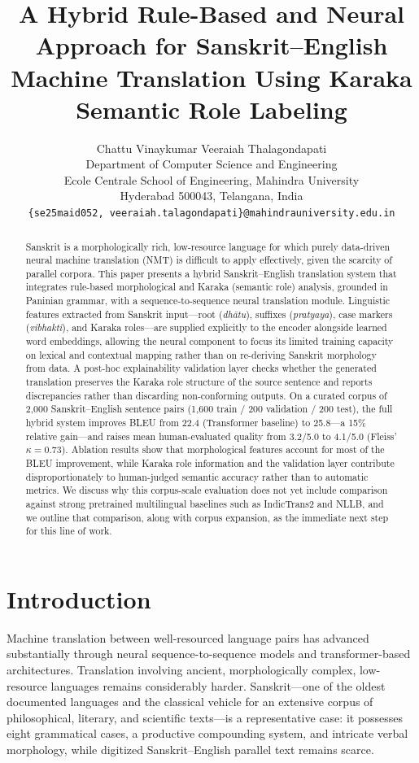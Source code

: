 \documentclass[11pt]{article}
\title{A Hybrid Rule-Based and Neural Approach for Sanskrit--English Machine Translation Using Karaka Semantic Role Labeling}
\author{Chattu Vinaykumar \quad Veeraiah Thalagondapati \\
  Department of Computer Science and Engineering \\
  Ecole Centrale School of Engineering, Mahindra University \\
  Hyderabad 500043, Telangana, India \\
  \texttt{\{se25maid052, veeraiah.talagondapati\}@mahindrauniversity.edu.in} \\
}
\date{}
\begin{document}
\maketitle

\begin{abstract}
Sanskrit is a morphologically rich, low-resource language for which purely data-driven neural machine translation (NMT) is difficult to apply effectively, given the scarcity of parallel corpora. This paper presents a hybrid Sanskrit--English translation system that integrates rule-based morphological and Karaka (semantic role) analysis, grounded in Paninian grammar, with a sequence-to-sequence neural translation module. Linguistic features extracted from Sanskrit input---root (\textit{dh\=atu}), suffixes (\textit{pratyaya}), case markers (\textit{vibhakti}), and Karaka roles---are supplied explicitly to the encoder alongside learned word embeddings, allowing the neural component to focus its limited training capacity on lexical and contextual mapping rather than on re-deriving Sanskrit morphology from data. A post-hoc explainability validation layer checks whether the generated translation preserves the Karaka role structure of the source sentence and reports discrepancies rather than discarding non-conforming outputs. On a curated corpus of 2,000 Sanskrit--English sentence pairs (1,600 train / 200 validation / 200 test), the full hybrid system improves BLEU from 22.4 (Transformer baseline) to 25.8---a 15\% relative gain---and raises mean human-evaluated quality from 3.2/5.0 to 4.1/5.0 (Fleiss' $\kappa = 0.73$). Ablation results show that morphological features account for most of the BLEU improvement, while Karaka role information and the validation layer contribute disproportionately to human-judged semantic accuracy rather than to automatic metrics. We discuss why this corpus-scale evaluation does not yet include comparison against strong pretrained multilingual baselines such as IndicTrans2 and NLLB, and we outline that comparison, along with corpus expansion, as the immediate next step for this line of work.
\end{abstract}

\section{Introduction}
Machine translation between well-resourced language pairs has advanced substantially through neural sequence-to-sequence models and transformer-based architectures. Translation involving ancient, morphologically complex, low-resource languages remains considerably harder. Sanskrit---one of the oldest documented languages and the classical vehicle for an extensive corpus of philosophical, literary, and scientific texts---is a representative case: it possesses eight grammatical cases, a productive compounding system, and intricate verbal morphology, while digitized Sanskrit--English parallel text remains scarce.
\end{document}
